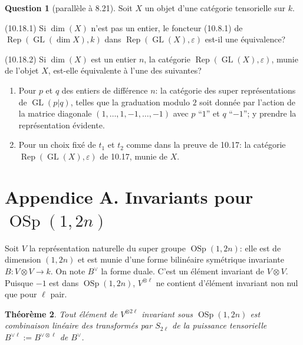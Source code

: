 \documentclass[11pt,a4paper]{article}
\theoremstyle{plain}
\newtheorem{theorem}{Th\'eor\`eme}[section]
\theoremstyle{definition}
\newtheorem{question}[theorem]{Question}
\DeclareMathOperator{\Rep}{Rep}
\DeclareMathOperator{\GL}{GL}
\DeclareMathOperator{\OSp}{OSp}
\newcommand{\eps}{\varepsilon}
\begin{document}
\begin{question}[parall\`ele \`a 8.21]
Soit $X$ un objet d'une cat\'egorie tensorielle sur $k$.

\textup{(10.18.1)} Si $\dim(X)$ n'est pas un entier, le foncteur (10.8.1) de $\Rep(\GL(\dim X), k)$ dans $\Rep(\GL(X), \eps)$ est-il une \'equivalence?

\textup{(10.18.2)} Si $\dim(X)$ est un entier $n$, la cat\'egorie $\Rep(\GL(X), \eps)$, munie de l'objet $X$, est-elle \'equivalente \`a l'une des suivantes?
\begin{enumerate}[label=(\alph*)]
\item Pour $p$ et $q$ des entiers de diff\'erence $n$: la cat\'egorie des super repr\'esentations de $\GL(p|q)$, telles que la graduation modulo $2$ soit donn\'ee par l'action de la matrice diagonale $(1, \ldots, 1, -1, \ldots, -1)$ avec $p$ ``$1$'' et $q$ ``$-1$''; y prendre la repr\'esentation \'evidente.
\item Pour un choix fix\'e de $t_1$ et $t_2$ comme dans la preuve de 10.17: la cat\'egorie $\Rep(\GL(X), \eps)$ de 10.17, munie de $X$.
\end{enumerate}
\end{question}


\section*{Appendice A. Invariants pour $\OSp(1, 2n)$}

Soit $V$ la repr\'esentation naturelle du super groupe $\OSp(1, 2n)$: elle est de dimension $(1, 2n)$ et est munie d'une forme bilin\'eaire sym\'etrique invariante $B : V \otimes V \to k$. On note $B^\vee$ la forme duale. C'est un \'el\'ement invariant de $V \otimes V$. Puisque $-1$ est dans $\OSp(1, 2n)$, $V^{\otimes \ell}$ ne contient d'\'el\'ement invariant non nul que pour $\ell$ pair.

\begin{theorem}
Tout \'el\'ement de $V^{\otimes 2\ell}$ invariant sous $\OSp(1, 2n)$ est combinaison lin\'eaire des transform\'es par $S_{2\ell}$ de la puissance tensorielle $B^{\vee \ell} := B^{\vee \otimes \ell}$ de $B^\vee$.
\end{theorem}
\end{document}
